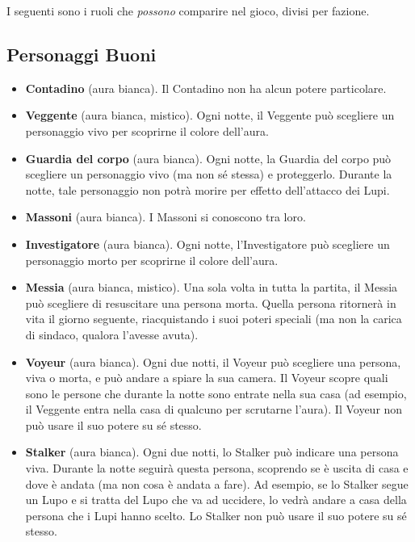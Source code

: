 \documentclass[a4paper,10pt]{article}
\begin{document}
I seguenti sono i ruoli che \emph{possono} comparire nel gioco, divisi per fazione.


\subsection*{Personaggi Buoni}

\begin{itemize}
 \item {\bf Contadino} (aura bianca). Il Contadino non ha alcun potere particolare.
 
 \item {\bf Veggente} (aura bianca, mistico). Ogni notte, il Veggente può scegliere un personaggio vivo per scoprirne il colore dell'aura.

 \item {\bf Guardia del corpo} (aura bianca). Ogni notte, la Guardia del corpo può scegliere un personaggio vivo (ma non sé stessa) e proteggerlo. Durante la notte, tale personaggio non potrà morire per effetto dell'attacco dei Lupi.
 
 \item {\bf Massoni} (aura bianca). I Massoni si conoscono tra loro.
 
 \item {\bf Investigatore} (aura bianca). Ogni notte, l'Investigatore può scegliere un personaggio morto per scoprirne il colore dell'aura.

 \item {\bf Messia} (aura bianca, mistico). Una sola volta in tutta la partita, il Messia può scegliere di resuscitare una persona morta. Quella persona ritornerà in vita il giorno seguente, riacquistando i suoi poteri speciali (ma non la carica di sindaco, qualora l'avesse avuta).

 \item {\bf Voyeur} (aura bianca). Ogni due notti, il Voyeur può scegliere una persona, viva o morta, e può andare a spiare la sua camera. Il Voyeur scopre quali sono le persone che durante la notte sono entrate nella sua casa (ad esempio, il Veggente entra nella casa di qualcuno per scrutarne l'aura).
 Il Voyeur non può usare il suo potere su sé stesso.

 \item {\bf Stalker} (aura bianca). Ogni due notti, lo Stalker può indicare una persona viva. Durante la notte seguirà questa persona, scoprendo se è uscita di casa e dove è andata (ma non cosa è andata a fare).
 Ad esempio, se lo Stalker segue un Lupo e si tratta del Lupo che va ad uccidere, lo vedrà andare a casa della persona che i Lupi hanno scelto.
 Lo Stalker non può usare il suo potere su sé stesso.
 

\end{itemize}
\end{document}
